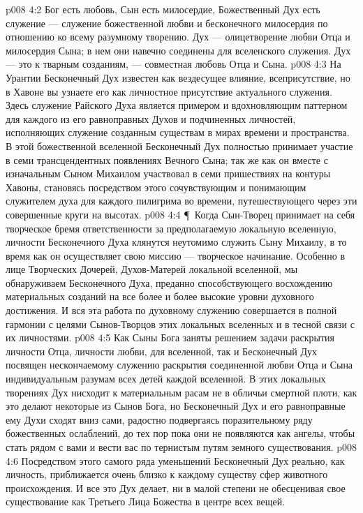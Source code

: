 \vs p008 4:2 Бог есть любовь, Сын есть милосердие, Божественный Дух есть служение --- служение божественной любви и бесконечного милосердия по отношению ко всему разумному творению. Дух --- олицетворение любви Отца и милосердия Сына; в нем они навечно соединены для вселенского служения. Дух --- это   к тварным созданиям, --- совместная любовь Отца и Сына.
\vs p008 4:3 На Урантии Бесконечный Дух известен как вездесущее влияние, всеприсутствие, но в Хавоне вы узнаете его как личностное присутствие актуального служения. Здесь служение Райского Духа является примером и вдохновляющим паттерном для каждого из его равноправных Духов и подчиненных личностей, исполняющих служение созданным существам в мирах времени и пространства. В этой божественной вселенной Бесконечный Дух полностью принимает участие в семи трансцендентных появлениях Вечного Сына; так же как он вместе с изначальным Сыном Михаилом участвовал в семи пришествиях на контуры Хавоны, становясь посредством этого сочувствующим и понимающим служителем духа для каждого пилигрима во времени, путешествующего через эти совершенные круги на высотах.
\vs p008 4:4 \P\ Когда Сын\hyp{}Творец принимает на себя творческое бремя ответственности за предполагаемую локальную вселенную, личности Бесконечного Духа клянутся неутомимо служить Сыну Михаилу, в то время как он осуществляет свою миссию --- творческое начинание. Особенно в лице Творческих Дочерей, Духов\hyp{}Матерей локальной вселенной, мы обнаруживаем Бесконечного Духа, преданно способствующего восхождению материальных созданий на все более и более высокие уровни духовного достижения. И вся эта работа по духовному служению совершается в полной гармонии с целями Сынов\hyp{}Творцов этих локальных вселенных и в тесной связи с их личностями.
\vs p008 4:5 Как Сыны Бога заняты решением задачи раскрытия личности Отца, личности любви, для вселенной, так и Бесконечный Дух посвящен нескончаемому служению раскрытия соединенной любви Отца и Сына индивидуальным разумам всех детей каждой вселенной. В этих локальных творениях Дух нисходит к материальным расам не в обличьи смертной плоти, как это делают некоторые из Сынов Бога, но Бесконечный Дух и его равноправные ему Духи сходят вниз сами, радостно подвергаясь поразительному ряду божественных ослаблений, до тех пор пока они не появляются как ангелы, чтобы стать рядом с вами и вести вас по тернистым путям земного существования.
\vs p008 4:6 Посредством этого самого ряда уменьшений Бесконечный Дух реально, как личность, приближается очень близко к каждому существу сфер животного происхождения. И все это Дух делает, ни в малой степени не обесценивая свое существование как Третьего Лица Божества в центре всех вещей.

